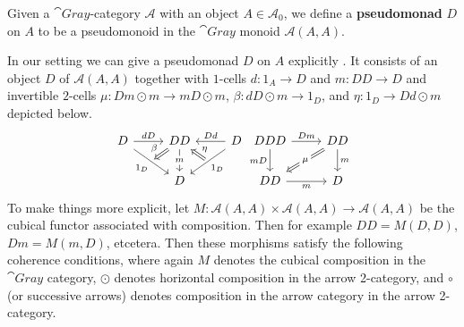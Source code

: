\begin{defn}{}
    Given a $\cat{Gray}$-category $\mathcal{A}$ with an object $A \in \mathcal{A}_0$, we define a \textbf{pseudomonad} $D$ on $A$ to be a pseudomonoid in the $\cat{Gray}$ monoid $\mathcal{A}(A,A)$.
\end{defn}

In our setting we can give a pseudomonad $D$ on $A$ explicitly \cite{MarmolejoF.1997Dwsf}. It consists of an object $D$ of $\mathcal{A}(A,A)$ together with $1$-cells $d:1_A\rightarrow D$ and $m:DD\rightarrow D$ and invertible $2$-cells $\mu:Dm\odot m \rightarrow mD\odot m$, $\beta:dD\odot m\rightarrow 1_D$, and $\eta:1_D\rightarrow Dd\odot m$ depicted below. 
\[\begin{tikzcd}
	D & DD & D \\
	& D
	\arrow[""{name=0, anchor=center, inner sep=0}, "{1_D}"', from=1-1, to=2-2]
	\arrow[""{name=1, anchor=center, inner sep=0}, "{1_D}", from=1-3, to=2-2]
	\arrow["dD", from=1-1, to=1-2]
	\arrow["Dd"', from=1-3, to=1-2]
	\arrow["m"{description}, from=1-2, to=2-2]
	\arrow["\beta"', shorten >=2pt, Rightarrow, from=1-2, to=0]
	\arrow["\eta"', shorten <=2pt, Rightarrow, from=1, to=1-2]
\end{tikzcd}
\begin{tikzcd}
	DDD & DD \\
	DD & D
	\arrow["Dm", from=1-1, to=1-2]
	\arrow["mD"', from=1-1, to=2-1]
	\arrow["m"', from=2-1, to=2-2]
	\arrow["m", from=1-2, to=2-2]
	\arrow["\mu"{description}, Rightarrow, from=1-2, to=2-1]
\end{tikzcd}
\]
To make things more explicit, let $M:\mathcal{A}(A,A)\times \mathcal{A}(A,A)\rightarrow \mathcal{A}(A,A)$ be the cubical functor associated with composition. Then for example $DD = M(D,D)$, $Dm = M(m,D)$, etcetera. Then these morphisms satisfy the following coherence conditions, where again $M$ denotes the cubical composition in the $\cat{Gray}$ category, $\odot$ denotes horizontal composition in the arrow 2-category, and $\circ$ (or successive arrows) denotes composition in the arrow category in the arrow 2-category.

